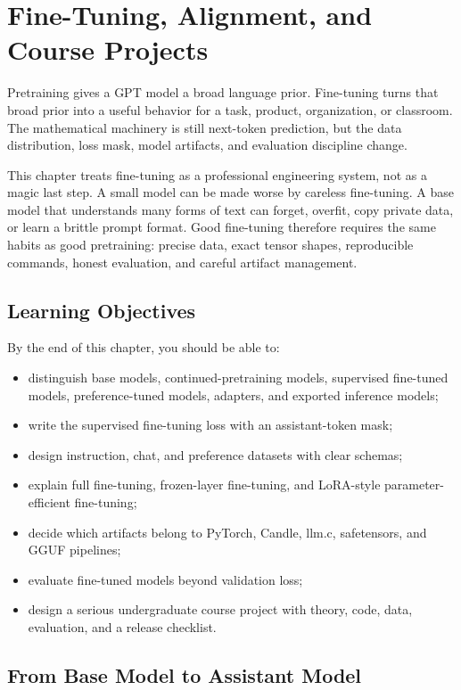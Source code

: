 \chapter{Fine-Tuning, Alignment, and Course Projects}

Pretraining gives a GPT model a broad language prior. Fine-tuning turns that broad prior into a useful behavior for a task, product, organization, or classroom. The mathematical machinery is still next-token prediction, but the data distribution, loss mask, model artifacts, and evaluation discipline change.

This chapter treats fine-tuning as a professional engineering system, not as a magic last step. A small model can be made worse by careless fine-tuning. A base model that understands many forms of text can forget, overfit, copy private data, or learn a brittle prompt format. Good fine-tuning therefore requires the same habits as good pretraining: precise data, exact tensor shapes, reproducible commands, honest evaluation, and careful artifact management.

\section{Learning Objectives}

By the end of this chapter, you should be able to:

\begin{itemize}
  \item distinguish base models, continued-pretraining models, supervised fine-tuned models, preference-tuned models, adapters, and exported inference models;
  \item write the supervised fine-tuning loss with an assistant-token mask;
  \item design instruction, chat, and preference datasets with clear schemas;
  \item explain full fine-tuning, frozen-layer fine-tuning, and LoRA-style parameter-efficient fine-tuning;
  \item decide which artifacts belong to PyTorch, Candle, llm.c, safetensors, and GGUF pipelines;
  \item evaluate fine-tuned models beyond validation loss;
  \item design a serious undergraduate course project with theory, code, data, evaluation, and a release checklist.
\end{itemize}

\section{From Base Model to Assistant Model}

